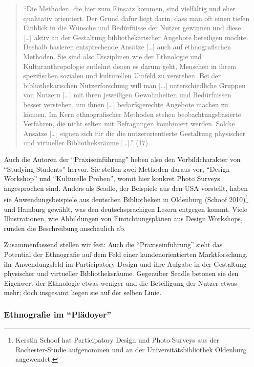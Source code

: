\documentclass[a4paper,
fontsize=11pt,
oneside,
numbers=noperiodatend,
parskip=half-,
bibliography=totoc,
final
]{scrartcl}
\begin{document}
\begin{quote}
\enquote{Die Methoden, die hier zum Einsatz kommen, sind vielfältig und
eher qualitativ orientiert. Der Grund dafür liegt darin, dass man oft
einen tiefen Einblick in die Wünsche und Bedürfnisse der Nutzer gewinnen
und diese {[}\ldots{}{]} aktiv an der Gestaltung bibliothekarischer
Angebote beteiligen möchte. Deshalb basieren entsprechende Ansätze
{[}\ldots{}{]} auch auf ethnografischen Methoden. Sie sind also
Disziplinen wie der Ethnologie und Kulturanthropologie entlehnt denen es
darum geht, Menschen in ihrem spezifischen sozialen und kulturellen
Umfeld zu verstehen. Bei der bibliothekarischen Nutzerforschung will man
{[}\ldots{}{]} unterschiedliche Gruppen von Nutzern {[}\ldots{}{]} mit
ihren jeweiligen Gewohnheiten und Bedürfnissen besser verstehen, um
ihnen {[}\ldots{}{]} bedarfsgerechte Angebote machen zu können. Im Kern
ethnografischer Methoden stehen beobachtungsbasierte Verfahren, die
nicht selten mit Befragungen kombiniert werden. Solche Ansätze
{[}\ldots{}{]} eignen sich für die die nutzerorientierte Gestaltung
physischer und virtueller Bibliotheksräume {[}\ldots{}{]}.} (17)
\end{quote}

Auch die Autoren der \enquote{Praxiseinführung} heben also den
Vorbildcharakter von \enquote{Studying Students} hervor. Sie stellen
zwei Methoden daraus vor, \enquote{Design Workshop} und
\enquote{Kulturelle Proben}, womit hier konkret Photo Surveys
angesprochen sind. Anders als Seadle, der Beispiele aus den USA
vorstellt, haben sie Anwendungsbeispiele aus deutschen Bibliotheken in
Oldenburg (Schoof 2010)\footnote{Kerstin Schoof hat Participatory Design
  und Photo Surveys aus der Rochester-Studie aufgenommen und an der
  Universitätsbibliothek Oldenburg angewendet.} und Hamburg gewählt, was
den deutschsprachigen Lesern entgegen kommt. Viele Illustrationen, wie
Abbildungen von Einrichtungsplänen aus Design Workshops, runden die
Beschreibung anschaulich ab.

Zusammenfassend stellen wir fest: Auch die \enquote{Praxiseinführung}
sieht das Potential der Ethnografie auf dem Feld einer
kundenorientierten Marktforschung, ihr Anwendungsfeld im Participatory
Design und ihre Aufgabe in der Gestaltung physischer und virtueller
Bibliotheksräume. Gegenüber Seadle betonen sie den Eigenwert der
Ethnologie etwas weniger und die Beteiligung der Nutzer etwas mehr; doch
insgesamt liegen sie auf der selben Linie.

\subsubsection{Ethnografie im
\enquote{Plädoyer}}\label{ethnografie-im-pluxe4doyer}
\end{document}
